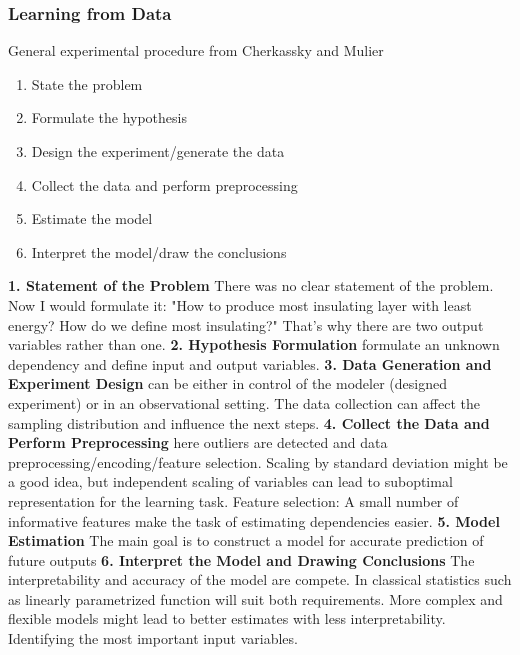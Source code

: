 

\subsubsection{Learning from Data}
General experimental procedure from Cherkassky and Mulier\cite{cherkassky1998learning}
\begin{enumerate}
	\item State the problem 
	\item Formulate the hypothesis
	\item Design the experiment/generate the data
	\item Collect the data and perform preprocessing
	\item Estimate the model 
	\item Interpret the model/draw the conclusions
\end{enumerate}
\textbf{1. Statement of the Problem} There was no clear statement of the problem. Now I would formulate it: "How to produce most insulating layer with least energy? How do we define most insulating?" That's why there are two output variables rather than one.
\textbf{2. Hypothesis Formulation} formulate an unknown dependency and define input and output variables.
\textbf{3. Data Generation and Experiment Design} can be either in control of the modeler (designed experiment) or in an observational setting. The data collection can affect the sampling distribution and influence the next steps. 
\textbf{4. Collect the Data and Perform Preprocessing} here outliers are detected and data preprocessing/encoding/feature selection. Scaling by standard deviation might be a good idea, but independent scaling of variables can lead to suboptimal representation for the learning task. Feature selection: A small number of informative features make the task of estimating dependencies easier. 
\textbf{5. Model Estimation} The main goal is to construct a model for accurate prediction of future outputs
\textbf{6. Interpret the Model and Drawing Conclusions} The interpretability and accuracy of the model are compete. In classical statistics such as linearly parametrized function will suit both requirements. More complex and flexible models might lead to better estimates with less interpretability. Identifying the most important input variables. \cite{cherkassky1998learning}

